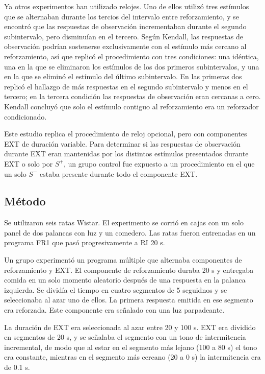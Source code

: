 \documentclass[a4paper,12pt]{article}
\begin{document}
Ya otros experimentos han utilizado relojes.
Uno de ellos utilizó tres estímulos que se alternaban durante los tercios del intervalo entre reforzamiento, y se encontró que las respuestas de observación incrementaban durante el segundo subintervalo, pero disminuían en el tercero.
Según Kendall, las respuestas de observación podrían sostenerse exclusivamente con el estímulo más cercano al reforzamiento, así que replicó el procedimiento con tres condiciones: una idéntica, una en la que se eliminaron los estímulos de los dos primeros subintervalos, y una en la que se eliminó el estímulo del último subintervalo.
En las primeras dos replicó el hallazgo de más respuestas en el segundo subintervalo y menos en el tercero; en la tercera condición las respuestas de observación eran cercanas a cero.
Kendall concluyó que solo el estímulo contiguo al reforzamiento era un reforzador condicionado.

Este estudio replica el procedimiento de reloj opcional, pero con componentes EXT de duración variable.
Para determinar si las respuestas de observación durante EXT eran mantenidas por los distintos estímulos presentados durante EXT o solo por $S^{+}$, un grupo control fue expuesto a un procedimiento en el que un solo $S^{-}$ estaba presente durante todo el componente EXT.

\subsection{Método}

Se utilizaron seis ratas Wistar.
El experimento se corrió en cajas con un solo panel de dos palancas con luz y un comedero.
Las ratas fueron entrenadas en un programa FR1 que pasó progresivamente a RI 20 s.

Un grupo experimentó un programa múltiple que alternaba componentes de reforzamiento y EXT.
El componente de reforzamiento duraba 20 s y entregaba comida en un solo momento aleatorio después de una respuesta en la palanca izquierda.
Se dividía el tiempo en cuatro segmentos de 5 seguidnos y se seleccionaba al azar uno de ellos.
La primera respuesta emitida en ese segmento era reforzada.
Este componente era señalado con una luz parpadeante.

La duración de EXT era seleccionada al azar entre 20 y 100 s.
EXT era dividido en segmentos de 20 s, y se señalaba el segmento con un tono de intermitencia incremental, de modo que al estar en el segmento más lejano (100 a 80 s) el tono era constante, mientras en el segmento más cercano (20 a 0 s) la intermitencia era de 0.1 s.
\end{document}
